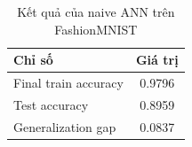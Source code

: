 \begin{table}[H]
\centering
\caption{Kết quả của naive ANN trên FashionMNIST}
\label{tab:fashion-mnist-naive-results}
\begin{tabular}{l c}
\toprule
Chỉ số & Giá trị \\
\midrule
Final train accuracy & 0.9796 \\
Test accuracy & 0.8959 \\
Generalization gap & 0.0837 \\
\bottomrule
\end{tabular}
\end{table}
